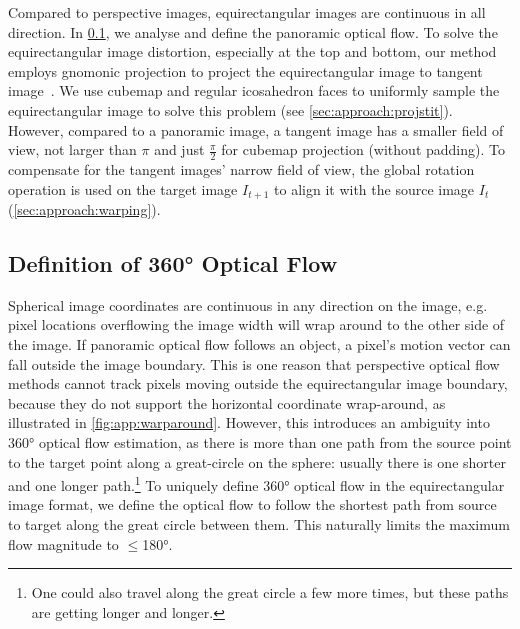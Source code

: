 Compared to perspective images, equirectangular images are continuous in all direction.
In \cref{sec:approach:definition}, we analyse and define the panoramic optical flow.
%
To solve the equirectangular image distortion, especially at the top and bottom, our method employs gnomonic projection to project the equirectangular image to tangent image~\cite{EderSLF2020}.
We use cubemap and regular icosahedron faces to uniformly sample the equirectangular image to solve this problem (see \cref{sec:approach:projstit}).
%
However, compared to a panoramic image, a tangent image has a smaller field of view, not larger than $\pi$ and just $\frac{\pi}{2}$ for cubemap projection (without padding).
To compensate for the tangent images' narrow field of view, the global rotation operation is used on the target image $I_{t+1}$ to align it with the source image $I_t$ (\cref{sec:approach:warping}).


\subsection{Definition of 360° Optical Flow}
\label{sec:approach:definition}

Spherical image coordinates are continuous in any direction on the image, e.g. pixel locations overflowing the image width will wrap around to the other side of the image.
%
If panoramic optical flow follows an object, a pixel's motion vector can fall outside the image boundary.
This is one reason that perspective optical flow methods cannot track pixels moving outside the equirectangular image boundary, because they do not support the horizontal coordinate wrap-around, as illustrated in \cref{fig:app:warparound}.
%
However, this introduces an ambiguity into 360° optical flow estimation, 
as there is more than one path from the source point to the target point along a great-circle on the sphere:
usually there is one shorter and one longer path.\footnote{One could also travel along the great circle a few more times, but these paths are getting longer and longer.}
%
To uniquely define 360° optical flow in the equirectangular image format, we define the optical flow to follow the shortest path from source to target along the great circle between them.
%
This naturally limits the maximum flow magnitude to $\leq$180°.


